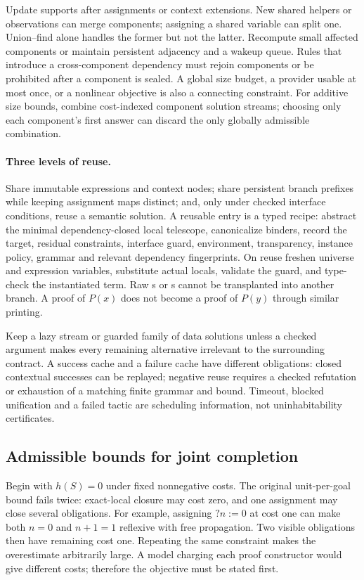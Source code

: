 Update supports after assignments or context extensions. New shared helpers
or observations can merge components; assigning a shared variable can split
one. Union--find alone handles the former but not the latter. Recompute small
affected components or maintain persistent adjacency and a wakeup queue.
Rules that introduce a cross-component dependency must rejoin components or
be prohibited after a component is sealed. A global size budget, a provider
usable at most once, or a nonlinear objective is also a connecting constraint.
For additive size bounds, combine cost-indexed component solution streams;
choosing only each component's first answer can discard the only globally
admissible combination.

\paragraph{Three levels of reuse.}
Share immutable expressions and context nodes; share persistent branch prefixes
while keeping assignment maps distinct; and, only under checked interface
conditions, reuse a semantic solution. A reusable entry is a typed recipe:
abstract the minimal dependency-closed local telescope, canonicalize binders,
record the target, residual constraints, interface guard, environment,
transparency, instance policy, grammar and relevant dependency fingerprints.
On reuse freshen universe and expression variables, substitute actual locals,
validate the guard, and type-check the instantiated term. Raw s
or s cannot be transplanted into another branch. A proof of
$P(x)$ does not become a proof of $P(y)$ through similar printing.

Keep a lazy stream or guarded family of data solutions unless a checked
argument makes every remaining alternative irrelevant to the surrounding
contract. A success cache and a failure cache have different obligations:
closed contextual successes can be replayed; negative reuse requires a checked
refutation or exhaustion of a matching finite grammar and bound. Timeout,
blocked unification and a failed tactic are scheduling information, not
uninhabitability certificates.

\subsection{Admissible bounds for joint completion}
\label{sec:search-bounds}

Begin with $h(S)=0$ under fixed nonnegative costs. The original unit-per-goal
bound fails twice: exact-local closure may cost zero, and one assignment may
close several obligations. For example, assigning $?n:=0$ at cost one can
make both $n=0$ and $n+1=1$ reflexive with free propagation. Two visible
obligations then have remaining cost one. Repeating the same constraint makes
the overestimate arbitrarily large. A model charging each proof constructor
would give different costs; therefore the objective must be stated first.


